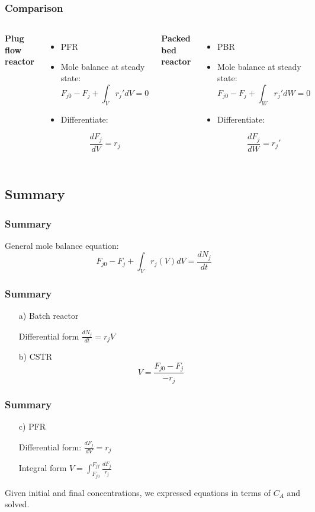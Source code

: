 \begin{frame}\frametitle{Comparison}
	\begin{columns}[t]
			\textbf{Plug flow reactor}
			\begin{itemize}
				\item	PFR
				\item	Mole balance at steady state: $$F_{j0} - F_j + \int_Vr_j'dV = 0$$ 
				\item	Differentiate:

				$$\boxed{\frac{dF_j}{dV} = r_j}$$
			\end{itemize}
			\textbf{Packed bed reactor}
			\begin{itemize}
				\item	PBR
				\item	Mole balance at steady state: $$F_{j0} - F_j + \int_Wr_j'dW = 0$$
				\item	Differentiate:

				$$\boxed{\frac{dF_j}{dW} = r_j'}$$
			\end{itemize}
	\end{columns}
	
	
\end{frame}

\subsection{Summary}
\begin{frame}\frametitle{Summary}
	General mole balance equation: $$ F_{j0} - F_j + \int_Vr_j(V)dV = \frac{dN_j}{dt} $$
\end{frame}

\begin{frame}\frametitle{Summary}
	\begin{itemize}
		\item[a)]{Batch reactor}

		Differential form $\displaystyle\frac{dN_j}{dt} = r_jV$
		\vspace{24pt}
		\item[b)]{CSTR} $$V = \frac{F_{j0} - F_j}{-r_j}$$
	\end{itemize}
\end{frame}

\begin{frame}\frametitle{Summary}
	\begin{itemize}
		\item[c)]{PFR}

		Differential form: $\displaystyle\frac{dF_j}{dV} = r_j$

		Integral form $V = \displaystyle\int_{F_{j0}}^{F_{jf}}\frac{dF_j}{r_j}$
	\end{itemize}
	
	Given initial and final concentrations, we expressed equations in terms of $C_A$ and solved.
\end{frame}

